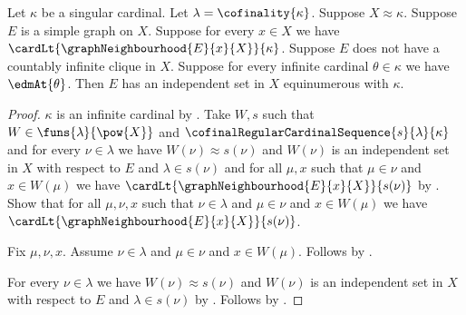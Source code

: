 \begin{theorem}\label{singular_small_degree_independent}
    Let $\kappa$ be a singular cardinal.
    Let $\lambda=\cofinality{\kappa}$.
    Suppose $X\approx\kappa$.
    Suppose $E$ is a simple graph on $X$.
    Suppose for every $x\in X$ we have
        $\cardLt{\graphNeighbourhood{E}{x}{X}}{\kappa}$.
    Suppose $E$ does not have a countably infinite clique in $X$.
    Suppose for every infinite cardinal $\theta\in\kappa$ we have $\edmAt{\theta}$.
    Then $E$ has an independent set in $X$ equinumerous with $\kappa$.
\end{theorem}
\begin{proof}
    $\kappa$ is an infinite cardinal by .
    Take $W,s$ such that
        $W\in\funs{\lambda}{\pow{X}}$ and
        $\cofinalRegularCardinalSequence{s}{\lambda}{\kappa}$ and
        for every $\nu\in\lambda$ we have
            $W(\nu)\approx s(\nu)$ and
            $W(\nu)$ is an independent set in $X$ with respect to $E$ and
            $\lambda\in s(\nu)$ and
            for all $\mu,x$ such that $\mu\in\nu$ and $x\in W(\mu)$ we have
                $\cardLt{\graphNeighbourhood{E}{x}{X}}{s(\nu)}$ by
        .
    Show that for all $\mu,\nu,x$ such that $\nu\in\lambda$ and
        $\mu\in\nu$ and $x\in W(\mu)$ we have
        $\cardLt{\graphNeighbourhood{E}{x}{X}}{s(\nu)}$.
    \begin{subproof}
        Fix $\mu,\nu,x$.
        Assume $\nu\in\lambda$ and $\mu\in\nu$ and $x\in W(\mu)$.
        Follows by \auto.
    \end{subproof}
    For every $\nu\in\lambda$ we have
        $W(\nu)\approx s(\nu)$ and
        $W(\nu)$ is an independent set in $X$ with respect to $E$ and
        $\lambda\in s(\nu)$ by \auto.
    Follows by .
\end{proof}
